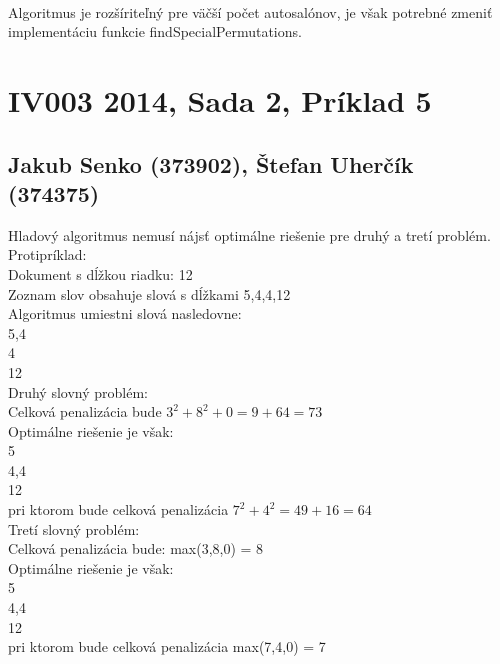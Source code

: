 \documentclass[paper=a4, fontsize=11pt]{scrartcl} %
\numberwithin{equation}{section} %
\numberwithin{figure}{section} %
\numberwithin{table}{section} %
\begin{document}
\ \\

Algoritmus je rozšíriteľný pre väčší počet autosalónov, je však potrebné zmeniť implementáciu funkcie findSpecialPermutations.

\pagebreak


\section*{IV003 2014, Sada 2, Príklad 5}
\subsection*{Jakub Senko (373902), Štefan Uherčík (374375)}

Hladový algoritmus nemusí nájsť optimálne riešenie pre druhý a tretí problém. \\
Protipríklad: \\
Dokument s dĺžkou riadku: 12 \\
Zoznam slov obsahuje slová s dĺžkami 5,4,4,12 \\

Algoritmus umiestni slová nasledovne: \\
5,4 \\
4 \\
12 \\

Druhý slovný problém: \\
Celková penalizácia bude $3^2 + 8^2 + 0 = 9 + 64 = 73$ \\

Optimálne riešenie je však: \\
5 \\
4,4 \\
12 \\
pri ktorom bude celková penalizácia $7^2 + 4^2 = 49 + 16 = 64$ \\

Tretí slovný problém: \\
Celková penalizácia bude: max(3,8,0) = 8 \\

Optimálne riešenie je však: \\
5 \\
4,4 \\
12 \\
pri ktorom bude celková penalizácia max(7,4,0) = 7 \\
\end{document}
